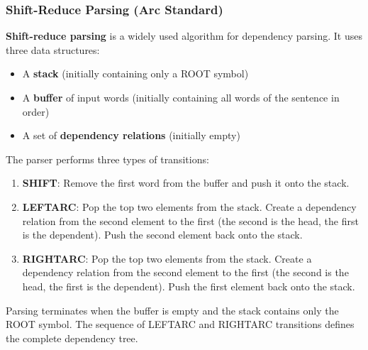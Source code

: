 \documentclass[11pt,a4paper]{article}
\begin{document}
\subsubsection{Shift-Reduce Parsing (Arc Standard)}

\textbf{Shift-reduce parsing} is a widely used algorithm for dependency parsing. It uses three data structures:
\begin{itemize}
    \item A \textbf{stack} (initially containing only a ROOT symbol)
    \item A \textbf{buffer} of input words (initially containing all words of the sentence in order)
    \item A set of \textbf{dependency relations} (initially empty)
\end{itemize}

The parser performs three types of transitions:
\begin{enumerate}
    \item \textbf{SHIFT}: Remove the first word from the buffer and push it onto the stack.
    \item \textbf{LEFTARC}: Pop the top two elements from the stack. Create a dependency relation from the second element to the first (the second is the head, the first is the dependent). Push the second element back onto the stack.
    \item \textbf{RIGHTARC}: Pop the top two elements from the stack. Create a dependency relation from the second element to the first (the second is the head, the first is the dependent). Push the first element back onto the stack.
\end{enumerate}

Parsing terminates when the buffer is empty and the stack contains only the ROOT symbol. The sequence of LEFTARC and RIGHTARC transitions defines the complete dependency tree.
\end{document}
